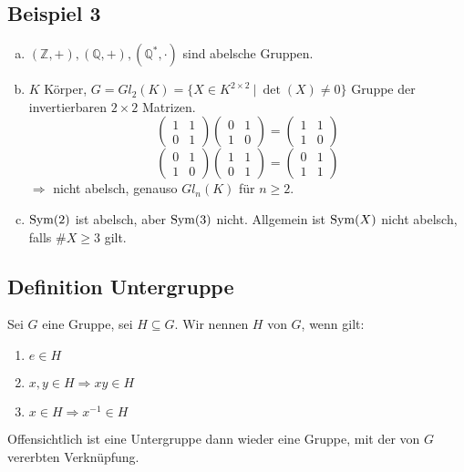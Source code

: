 \subsection{Beispiel 3}
\label{sub:beispiel_3}
\begin{enumerate}[(a)]
	\item $(\mathds{Z}, +), (\mathds{Q}, +), (\mathds{Q}^*,\cdot)$ sind abelsche Gruppen.
	\item $K$ Körper, $G=Gl_2(K)=\{X \in K^{2\times 2}~ |~ \det(X)\not= 0 \}$ Gruppe der invertierbaren $2 \times 2$ Matrizen.\\
\[
	\begin{pmatrix}	1 & 1\\ 0 & 1 \end{pmatrix}
	\begin{pmatrix} 0 & 1\\	1 & 0 \end{pmatrix}
	=
	\begin{pmatrix}	1 & 1\\	1 & 0 \end{pmatrix}
\]
\[
	\begin{pmatrix} 0 & 1\\	1 & 0 \end{pmatrix}
	\begin{pmatrix} 1 & 1\\ 0 & 1 \end{pmatrix}
	=
	\begin{pmatrix} 0 & 1\\ 1 & 1 \end{pmatrix}
\]
	$\Rightarrow$ nicht abelsch, genauso $Gl_n(K)$ für $n\ge 2$.
	\item $\operatorname{Sym}(2)$ ist abelsch, aber $\operatorname{Sym}(3)$ nicht. Allgemein ist $\operatorname{Sym}(X)$ nicht abelsch, falls $\#X \ge 3$ gilt.
\end{enumerate}

\subsection{Definition Untergruppe}
\label{sub: def_untergruppe}
Sei $G$ eine Gruppe, sei $H\subseteq G$. Wir nennen $H$   von $G$, wenn gilt:
\begin{enumerate}[(UG1)]
	\item $e\in H$
	\item $x,y\in H \Rightarrow xy\in H$
	\item $x\in H \Rightarrow x^{-1} \in H$
\end{enumerate}
Offensichtlich ist eine Untergruppe dann wieder eine Gruppe, mit der von $G$ vererbten Verknüpfung.

